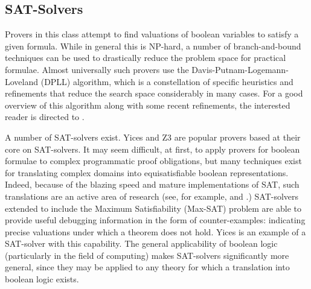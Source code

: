 \subsection{SAT-Solvers} Provers in this class attempt to find valuations of boolean variables to satisfy a given formula.  While in general this is NP-hard, a number of branch-and-bound techniques can be used to drastically reduce the problem space for practical formulae.  Almost universally such provers use the Davis-Putnam-Logemann-Loveland (DPLL) algorithm, which is a constellation of specific heuristics and refinements that reduce the search space considerably in many cases.  For a good overview of this algorithm along with some recent refinements, the interested reader is directed to \cite{nieuwenhuisDPLL}.

A number of SAT-solvers exist.  Yices\cite{yices} and Z3 are popular provers based at their core on SAT-solvers.  It may seem difficult, at first, to apply provers for boolean formulae to complex programmatic proof obligations, but many techniques exist for translating complex domains into equisatisfiable boolean representations.  Indeed, because of the blazing speed and mature implementations of SAT, such translations are an active area of research (see, for example, \cite{ganeshArrayDecision} and \cite{sheiniIntegerDecision}.)  SAT-solvers extended to include the Maximum Satisfiability (Max-SAT) problem are able to provide useful debugging information in the form of counter-examples: indicating precise valuations under which a theorem does not hold.  Yices is an example of a SAT-solver with this capability.  The general applicability of boolean logic (particularly in the field of computing) makes SAT-solvers significantly more general, since they may be applied to any theory for which a translation into boolean logic exists.

